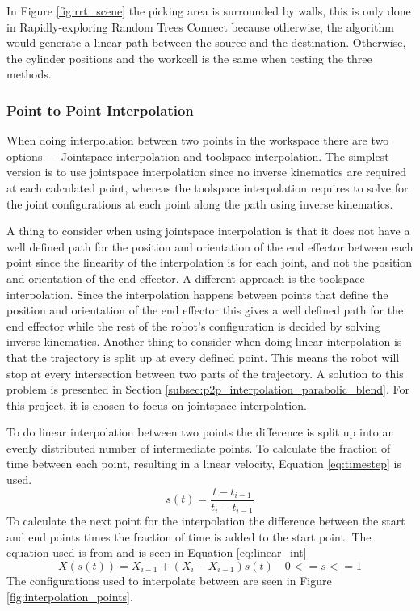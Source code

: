 \documentclass[../main.tex]{subfiles}
\begin{document}
In Figure \ref{fig:rrt_scene} the picking area is surrounded by walls, this is only done in Rapidly-exploring Random Trees Connect because otherwise, the algorithm would generate a linear path between the source and the destination. Otherwise, the cylinder positions and the workcell is the same when testing the three methods.

\subsubsection{Point to Point Interpolation} \label{subsec:p2p_interpolation}
When doing interpolation between two points in the workspace there are two options --- Jointspace interpolation and toolspace interpolation. The simplest version is to use jointspace interpolation since no inverse kinematics are required at each calculated point, whereas the toolspace interpolation requires to solve for the joint configurations at each point along the path using inverse kinematics.

A thing to consider when using jointspace interpolation is that it does not have a well defined path for the position and orientation of the end effector between each point since the linearity of the interpolation is for each joint, and not the position and orientation of the end effector. A different approach is the toolspace interpolation. Since the interpolation happens between points that define the position and orientation of the end effector this gives a well defined path for the end effector while the rest of the robot's configuration is decided by solving inverse kinematics. Another thing to consider when doing linear interpolation is that the trajectory is split up at every defined point. This means the robot will stop at every intersection between two parts of the trajectory. A solution to this problem is presented in Section \ref{subsec:p2p_interpolation_parabolic_blend}. For this project, it is chosen to focus on jointspace interpolation.

To do linear interpolation between two points the difference is split up into an evenly distributed number of intermediate points. To calculate the fraction of time between each point, resulting in a linear velocity, Equation \ref{eq:timestep} is used.
\begin{equation}\label{eq:timestep}
    s(t)=\frac{t-t_{i-1}}{t_i-t_{i-1}}
\end{equation}
To calculate the next point for the interpolation the difference between the start and end points times the fraction of time is added to the start point. The equation used is from \cite{lec_notes} and is seen in Equation \ref{eq:linear_int}
\begin{equation}\label{eq:linear_int}
    X(s(t))=X_{i-1}+(X_i-X_{i-1})s(t)\quad0<=s<=1
\end{equation}
The configurations used to interpolate between are seen in Figure \ref{fig:interpolation_points}.
\end{document}
